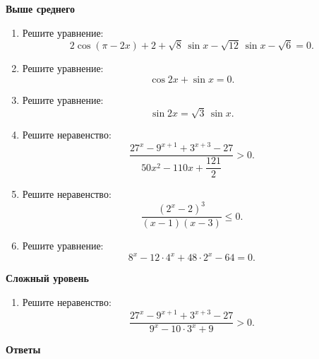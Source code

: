 \documentclass[a4paper,12pt]{article}
\newcommand{\subcheck}[1]{%
    \vspace{0.25em}
    {\large\bfseries\textcolor{accent}{#1}}\par
    \vspace{0.15em}
}
\begin{document}
\subcheck{Выше среднего}

\begin{enumerate}[label=\textbf{\arabic*.},start=4]

\item Решите уравнение:
\[
    2\cos(\pi-2x)+2
    +\sqrt8\,\sin x
    -\sqrt{12}\,\sin x
    -\sqrt6
    =0.
\]

\item Решите уравнение:
\[
    \cos2x+\sin x=0.
\]

\item Решите уравнение:
\[
    \sin2x=\sqrt3\,\sin x.
\]

\item Решите неравенство:
\[
    \frac{
        27^x-9^{x+1}+3^{x+3}-27
    }{
        50x^2-110x+\dfrac{121}{2}
    }>0.
\]

\item Решите неравенство:
\[
    \frac{(2^x-2)^3}{(x-1)(x-3)}
    \le0.
\]

\item Решите уравнение:
\[
    8^x-12\cdot4^x+48\cdot2^x-64=0.
\]

\end{enumerate}

\subcheck{Сложный уровень}

\begin{enumerate}[label=\textbf{\arabic*.},start=10]

\item Решите неравенство:
\[
    \frac{
        27^x-9^{x+1}+3^{x+3}-27
    }{
        9^x-10\cdot3^x+9
    }>0.
\]

\end{enumerate}

\newpage

\begin{center}
    {\LARGE\bfseries\textcolor{darkaccent}{Ответы}}
\end{center}

\vspace{0.5cm}
\end{document}
